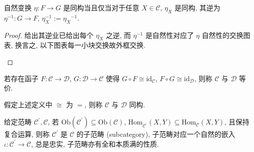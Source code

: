 \begin{lemma}
    自然变换 \(\eta : F \to G\) 是同构当且仅当对于任意 \(X \in \mathcal{C}\), \(\eta_X\) 是同构,
    其逆为 \(\eta^{-1} : G \to F\), \(\eta^{-1}_X := {\eta_X}^{-1}\).

    \begin{proof}
        给出其逆业已给出每个 \(\eta_X\) 之逆, 而 \(\eta^{-1}\) 是自然性对应了
        \(\eta\) 自然性的交换图表, 换言之, 以下图表每一小块交换故外框交换.

        \begin{center}
        \end{center}
    \end{proof}
\end{lemma}

\begin{definition}[范畴等价]
    若存在函子 \(F : \mathcal{C} \to \mathcal{D}\), \(G : \mathcal{D} \to \mathcal{C}\) 使得 \(G \circ F \cong \mathrm{id}_{\mathcal{C}}\), \(F \circ G \cong \mathrm{id}_{\mathcal{D}}\), 则称 \(\mathcal{C}\) 与 \(\mathcal{D}\) 等价.

    假定上述定义中 \(\cong\) 为 \(=\), 则称 \(\mathcal{C}\) 与 \(\mathcal{D}\) 同构.
\end{definition}

\begin{definition}[子范畴]
    给定范畴 \(\mathcal{C}^\prime, \mathcal{C}\), 若 \(\mathrm{Ob} (\mathcal{C}^\prime) \subseteq \mathrm{Ob} (\mathcal{C})\), 
    \(\mathrm{Hom}_{\mathcal{C}^\prime} (X,Y) \subseteq \mathrm{Hom}_{\mathcal{C}} (X,Y)\), 且保持复合运算,
    则称 \(\mathcal{C}^\prime\) 是 \(\mathcal{C}\) 的子范畴 (subcategory), 子范畴对应一个自然的嵌入 \(\iota : \mathcal{C}^\prime \to \mathcal{C}\),
    总是忠实, 子范畴亦有全和本质满的性质.
\end{definition}

